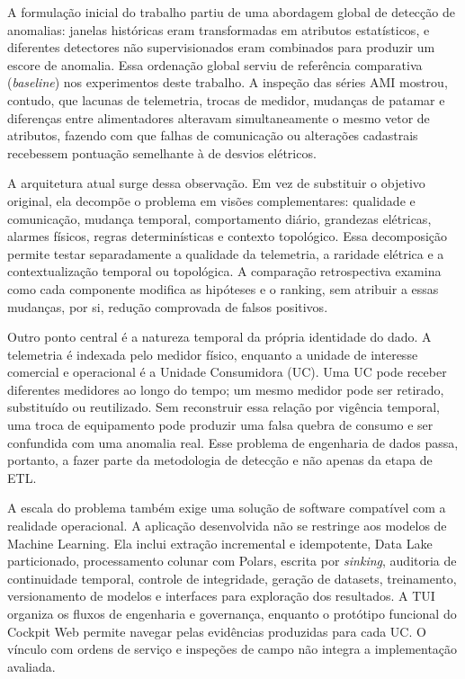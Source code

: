 A formulação inicial do trabalho partiu de uma abordagem global de detecção de anomalias: janelas históricas eram transformadas em atributos estatísticos, e diferentes detectores não supervisionados eram combinados para produzir um escore de anomalia. Essa ordenação global serviu de referência comparativa (\emph{baseline}) nos experimentos deste trabalho. A inspeção das séries AMI mostrou, contudo, que lacunas de telemetria, trocas de medidor, mudanças de patamar e diferenças entre alimentadores alteravam simultaneamente o mesmo vetor de atributos, fazendo com que falhas de comunicação ou alterações cadastrais recebessem pontuação semelhante à de desvios elétricos.

A arquitetura atual surge dessa observação. Em vez de substituir o objetivo original, ela decompõe o problema em visões complementares: qualidade e comunicação, mudança temporal, comportamento diário, grandezas elétricas, alarmes físicos, regras determinísticas e contexto topológico. Essa decomposição permite testar separadamente a qualidade da telemetria, a raridade elétrica e a contextualização temporal ou topológica. A comparação retrospectiva examina como cada componente modifica as hipóteses e o ranking, sem atribuir a essas mudanças, por si, redução comprovada de falsos positivos.

Outro ponto central é a natureza temporal da própria identidade do dado. A telemetria é indexada pelo medidor físico, enquanto a unidade de interesse comercial e operacional é a Unidade Consumidora (UC). Uma UC pode receber diferentes medidores ao longo do tempo; um mesmo medidor pode ser retirado, substituído ou reutilizado. Sem reconstruir essa relação por vigência temporal, uma troca de equipamento pode produzir uma falsa quebra de consumo e ser confundida com uma anomalia real. Esse problema de engenharia de dados passa, portanto, a fazer parte da metodologia de detecção e não apenas da etapa de ETL.

A escala do problema também exige uma solução de software compatível com a realidade operacional. A aplicação desenvolvida não se restringe aos modelos de Machine Learning. Ela inclui extração incremental e idempotente, Data Lake particionado, processamento colunar com Polars, escrita por \emph{sinking}, auditoria de continuidade temporal, controle de integridade, geração de datasets, treinamento, versionamento de modelos e interfaces para exploração dos resultados. A TUI organiza os fluxos de engenharia e governança, enquanto o protótipo funcional do Cockpit Web permite navegar pelas evidências produzidas para cada UC. O vínculo com ordens de serviço e inspeções de campo não integra a implementação avaliada.

